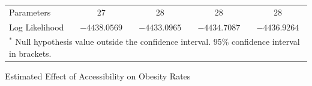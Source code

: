 \documentclass[shortAfour,sageh.bst]{sagej}
\begin{document}
\begin{table}
\begin{center}
{\begin{tabular}{l c c c c}
Parameters                          & $27$                   & $28$                   & $28$                   & $28$                   \\
Log Likelihood                      & $-4438.0569$           & $-4433.0965$           & $-4434.7087$           & $-4436.9264$           \\
\bottomrule
\multicolumn{5}{l}{\scriptsize{$^*$ Null hypothesis value outside the confidence interval. 95\% confidence interval in brackets.}}
\end{tabular}
}\end{center}
\end{table}

\begin{table}
  \caption{\label{tab:ob-fullmodels} Estimated Effect of Accessibility on Obesity Rates}
  \begin{center}
  \scalebox{0.8}{

}
\end{center}
\end{table}
\end{document}
